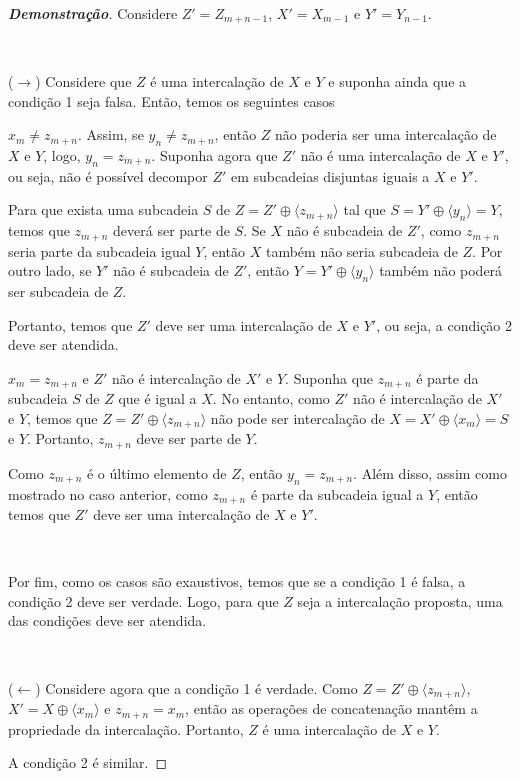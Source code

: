 \begin{proof}[\textbf{Demonstração}]
    Considere $Z' = Z_{m + n - 1}$, $X' = X_{m - 1}$ e $Y' = Y_{n - 1}$.

    ~

    ($\rightarrow$) Considere que $Z$ é uma intercalação de $X$ e $Y$ e suponha ainda que a condição 1 seja falsa. Então, temos os seguintes casos

    \begin{casos}
        \item $x_m \ne z_{m + n}$. Assim, se $y_n \ne z_{m + n}$, então $Z$ não poderia ser uma intercalação de $X$ e $Y$, logo, $y_n = z_{m + n}$. Suponha agora que $Z'$ não é uma intercalação de $X$ e $Y'$, ou seja, não é possível decompor $Z'$ em subcadeias disjuntas iguais a $X$ e $Y'$.

        Para que exista uma subcadeia $S$ de $Z = Z' \oplus \langle z_{m + n} \rangle$ tal que $S = Y' \oplus \langle y_n \rangle = Y$, temos que $z_{m + n}$ deverá ser parte de $S$. Se $X$ não é subcadeia de $Z'$, como $z_{m + n}$ seria parte da subcadeia igual $Y$, então $X$ também não seria subcadeia de $Z$. Por outro lado, se $Y'$ não é subcadeia de $Z'$, então $Y = Y' \oplus \langle y_n \rangle$ também não poderá ser subcadeia de $Z$.

        Portanto, temos que $Z'$ deve ser uma intercalação de $X$ e $Y'$, ou seja, a condição 2 deve ser atendida.

        \item $x_m = z_{m + n}$ e $Z'$ não é intercalação de $X'$ e $Y$. Suponha que $z_{m + n}$ é parte da subcadeia $S$ de $Z$ que é igual a $X$. No entanto, como $Z'$ não é intercalação de $X'$ e $Y$, temos que $Z = Z' \oplus \langle z_{m + n} \rangle$ não pode ser intercalação de $X = X' \oplus \langle x_m \rangle = S$ e $Y$. Portanto, $z_{m + n}$ deve ser parte de $Y$.

        Como $z_{m + n}$ é o último elemento de $Z$, então $y_n = z_{m + n}$. Além disso, assim como mostrado no caso anterior, como $z_{m + n}$ é parte da subcadeia igual a $Y$, então temos que $Z'$ deve ser uma intercalação de $X$ e $Y'$.
    \end{casos}

    ~

    Por fim, como os casos são exaustivos, temos que se a condição 1 é falsa, a condição 2 deve ser verdade. Logo, para que $Z$ seja a intercalação proposta, uma das condições deve ser atendida.

    ~

    ($\leftarrow$) Considere agora que a condição 1 é verdade. Como $Z = Z' \oplus \langle z_{m + n} \rangle$, $X' = X \oplus \langle x_m \rangle$ e $z_{m + n} = x_m$, então as operações de concatenação mantêm a propriedade da intercalação. Portanto, $Z$ é uma intercalação de $X$ e $Y$.

    A condição 2 é similar.
\end{proof}


